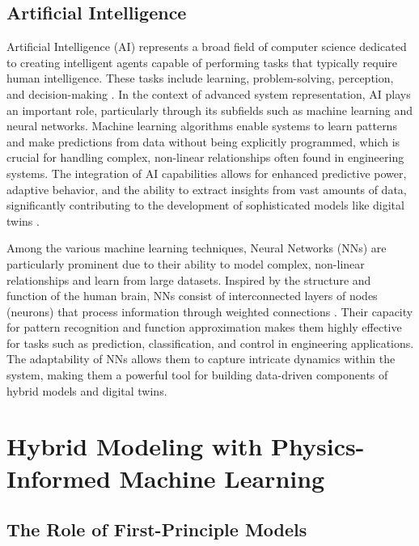 \documentclass[
  12pt,
  oneside,
  a4paper,
  english,
  brazil]{abntex2}
\begin{document}
\subsection{Artificial Intelligence}\label{artificial-intelligence}

Artificial Intelligence (AI) represents a broad field of computer
science dedicated to creating intelligent agents capable of performing
tasks that typically require human intelligence. These tasks include
learning, problem-solving, perception, and decision-making
\citet{russell2010artificial}. In the context of advanced system
representation, AI plays an important role, particularly through its
subfields such as machine learning and neural networks. Machine learning
algorithms enable systems to learn patterns and make predictions from
data without being explicitly programmed, which is crucial for handling
complex, non-linear relationships often found in engineering systems.
The integration of AI capabilities allows for enhanced predictive power,
adaptive behavior, and the ability to extract insights from vast amounts
of data, significantly contributing to the development of sophisticated
models like digital twins \citet{kreuzer2024artificial}.

Among the various machine learning techniques, Neural Networks (NNs) are
particularly prominent due to their ability to model complex, non-linear
relationships and learn from large datasets. Inspired by the structure
and function of the human brain, NNs consist of interconnected layers of
nodes (neurons) that process information through weighted connections
\citet{goodfellow2016deep}. Their capacity for pattern recognition and
function approximation makes them highly effective for tasks such as
prediction, classification, and control in engineering applications. The
adaptability of NNs allows them to capture intricate dynamics within the
system, making them a powerful tool for building data-driven components
of hybrid models and digital twins.

\section{\texorpdfstring{\textbf{Hybrid Modeling with Physics-Informed Machine Learning}}{}}\label{section-2}

\subsection{The Role of First-Principle
Models}\label{the-role-of-first-principle-models}
\end{document}
